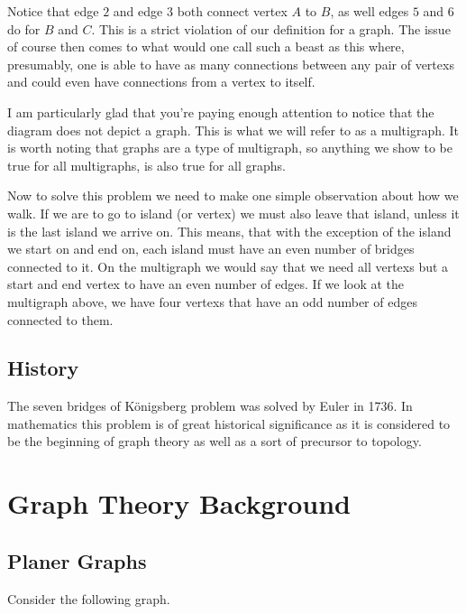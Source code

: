 \documentclass{article}
\begin{document}
Notice that \gls{edge} $2$ and \gls{edge} $3$ both connect \gls{vertex} $A$ to $B$, as well \glspl{edge} $5$ and $6$ do for $B$ and $C$. This is a strict violation of our definition for a \gls{graph}. The issue of course then comes to what would one call such a beast as this where, presumably, one is able to have as many connections between any pair of \glspl{vertex} and could even have connections from a \gls{vertex} to itself.

I am particularly glad that you're paying enough attention to notice that the diagram does not depict a \gls{graph}. This is what we will refer to as a \gls{multigraph}. It is worth noting that \glspl{graph} are a type of \gls{multigraph}, so anything we show to be true for all \glspl{multigraph}, is also true for all \glspl{graph}.

Now to solve this problem we need to make one simple observation about how we walk. If we are to go to island (or vertex) we must also leave that island, unless it is the last island we arrive on. This means, that with the exception of the island we start on and end on, each island must have an even number of bridges connected to it. On the \gls{multigraph} we would say that we need all \glspl{vertex} but a start and end \gls{vertex} to have an even number of edges. If we look at the \gls{multigraph} above, we have four \glspl{vertex} that have an odd number of \glspl{edge} connected to them.

\subsection{History}
The seven bridges of K\"onigsberg problem was solved by Euler %
in 1736. In mathematics this problem is of great historical significance as it is considered to be the beginning of graph theory as well as a sort of precursor to topology. %

\section{Graph Theory Background}

\subsection{Planer Graphs}

Consider the following \gls{graph}.
\end{document}
